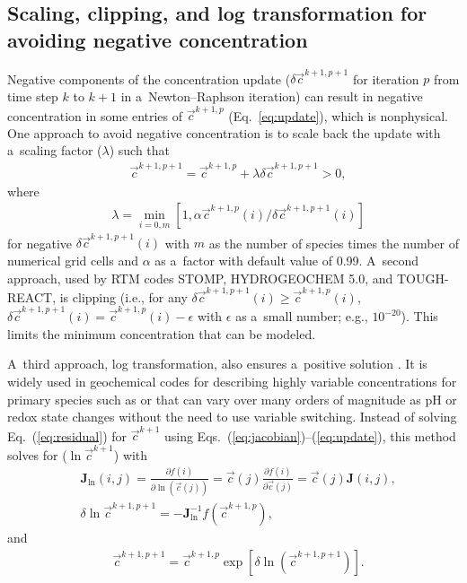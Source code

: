 \documentclass[gmdd, online, hvmath]{copernicus}
\begin{document}
\subsection{Scaling, clipping, and log transformation for avoiding negative concentration}%

      Negative components of the concentration update ($\delta
      \vec{c}^{k+1,p+1}$ for iteration $p$ from time step $k$ to $k+1$ in
      a~Newton--Raphson iteration) can result in negative concentration in
      some entries of $\vec{c}^{k+1,p}$ (Eq.~\ref{eq:update}), which is
      nonphysical. One approach to avoid negative concentration is to scale
      back the update with a~scaling factor ($\lambda$)
      \citep{Bethke2007,Hammond2003} such that
\begin{align}
 &
\vec{c}^{k+1,p+1}=\vec{c}^{k+1,p}+\lambda \delta \vec{c}^{k+1,p+1} > 0,
\label{eq:lambda}
\end{align}%
      where
\begin{align}
 &
\lambda = \min_{i=0,m} [1, \alpha {\vec{c}^{k+1,p}(i)}/{\delta \vec{c}^{k+1,p+1} (i)}]
\label{eq:alpha}
\end{align}%
      for negative $\delta \vec{c}^{k+1,p+1} (i)$ with $m$ as the number of
      species times the number of numerical grid cells and $\alpha$ as
      a~factor with default value of 0.99. A~second approach, used by RTM
      codes STOMP, HYDROGEOCHEM 5.0, and TOUGH-REACT, is clipping (i.e., for
      any $\delta \vec{c}^{k+1,p+1}(i) \geq \vec{c}^{k+1,p}(i)$, $\delta
      \vec{c}^{k+1,p+1}(i) = \vec{c}^{k+1,p}(i) - \epsilon$ with $\epsilon$ as
      a~small number; e.g., $10^{-20}$). This limits the minimum
      concentration that can be modeled.

      A~third approach, log transformation, also ensures a~positive solution
      \citep{Bethke2007,Hammond2003,Parkhurst1999}. It is widely used in
      geochemical codes for describing highly variable concentrations for
      primary species such as  or  that can vary over
      many orders of magnitude as pH or redox state changes without the need
      to use variable switching. Instead of solving Eq.~(\ref{eq:residual})
      for $\vec{c}^{k+1}$ using Eqs.~(\ref{eq:jacobian})--(\ref{eq:update}),
      this method solves for ($\ln\vec{c}^{k+1}$) \citep{Hammond2003} with
\begin{align}
 &
\mathbf{J}_{\ln}(i, j) =
\frac{\partial {f}(i)}{\partial \ln(\vec{c}(j))} = \vec{c}(j) \frac{\partial {f}(i)}{\partial \vec{c}(j)} = \vec{c}(j) \mathbf{J}(i, j),
\label{eq:jacobianlt}\\
&
\delta \ln\vec{c}^{k+1,p+1}= -\mathbf{J}^{-1}_{\ln} {f} (\vec{c}^{k+1,p}),
\label{eq:axblt}
\end{align}%
      and
\begin{align}
 &
\vec{c}^{k+1,p+1}=\vec{c}^{k+1,p}\exp [\delta \ln(\vec{c}^{k+1,p+1})].
\label{eq:updatelt}
\end{align}%
\end{document}
